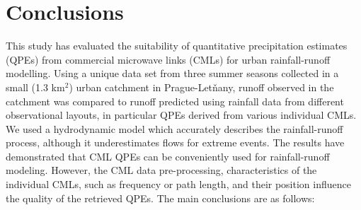 \documentclass{ctuthesis}\usepackage[]{graphicx}\usepackage[]{color}
\begin{document}
\section{Conclusions}

This study has evaluated the suitability of quantitative precipitation estimates (QPEs) from commercial microwave links (CMLs) for urban rainfall-runoff modelling. Using a unique data set from three summer seasons collected in a small (1.3 km$^2$) urban catchment in Prague-Letňany, runoff observed in the catchment was compared to runoff predicted using rainfall data from different observational layouts, in particular QPEs derived from various individual CMLs. We used a hydrodynamic model which accurately describes the rainfall-runoff process, although it underestimates flows for extreme events. The results have demonstrated that CML QPEs can be conveniently used for rainfall-runoff modeling. However, the CML data pre-processing, characteristics of the individual CMLs, such as frequency or path length, and their position influence the quality of the retrieved QPEs. The main conclusions are as follows:
\end{document}

